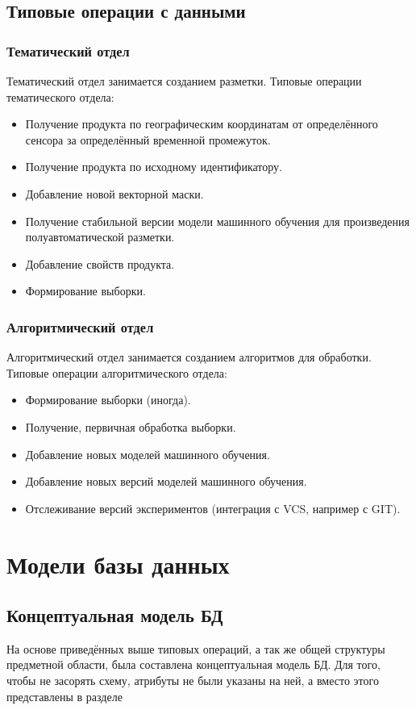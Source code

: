\documentclass[a4paper]{article}
\begin{document}
\subsection{Типовые операции с данными}
\subsubsection{Тематический отдел}
Тематический отдел занимается созданием разметки.
Типовые операции тематического отдела:
\begin{itemize}
	\item Получение продукта по географическим координатам от определённого сенсора за определённый временной промежуток.
	\item Получение продукта по исходному идентификатору.
	\item Добавление новой векторной маски.
	\item Получение стабильной версии модели машинного обучения для произведения полуавтоматической разметки.
	\item Добавление свойств продукта.
	\item Формирование выборки.
\end{itemize}

\subsubsection{Алгоритмический отдел}
Алгоритмический отдел занимается созданием алгоритмов для обработки.
Типовые операции алгоритмического отдела:
\begin{itemize}
	\item Формирование выборки (иногда).
	\item Получение, первичная обработка выборки.
	\item Добавление новых моделей машинного обучения.
	\item Добавление новых версий моделей машинного обучения.
	\item Отслеживание версий экспериментов (интеграция с VCS, например с GIT).
\end{itemize}

\section{Модели базы данных}
\subsection{Концептуальная модель БД}
На основе приведённых выше типовых операций, а так же общей структуры предметной области, была составлена концептуальная модель БД.
Для того, чтобы не засорять схему, атрибуты не были указаны на ней, а вместо этого представлены в разделе 
\end{document}
